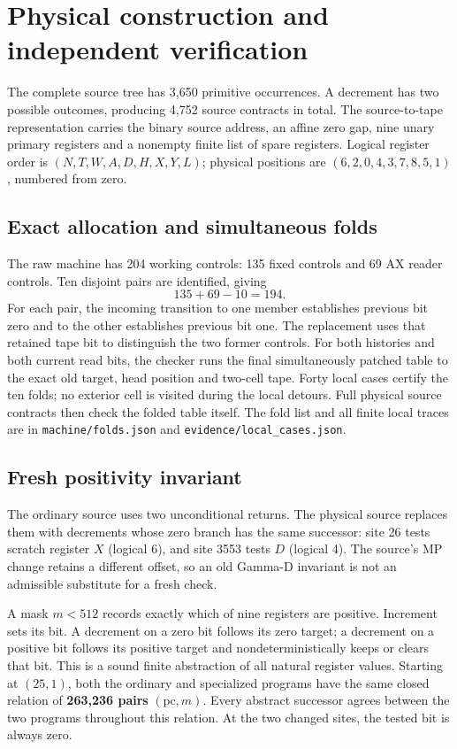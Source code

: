 \documentclass[11pt,letterpaper]{article}
\newcommand{\file}[1]{\texttt{\nolinkurl{#1}}}
\begin{document}
\section{Physical construction and independent verification}
\label{sec:physical}

The complete source tree has 3,650 primitive occurrences. A decrement has
two possible outcomes, producing 4,752 source contracts in total. The
source-to-tape representation carries the binary source address, an affine
zero gap, nine unary primary registers and a nonempty finite list of spare
registers. Logical register order is $(N,T,W,A,D,H,X,Y,L)$; physical positions
are $(6,2,0,4,3,7,8,5,1)$, numbered from zero.

\subsection{Exact allocation and simultaneous folds}

The raw machine has 204 working controls: 135 fixed controls and 69 AX
reader controls. Ten disjoint pairs are identified, giving
\[
                         135+69-10=194.
\]
For each pair, the incoming transition to one member establishes previous
bit zero and to the other establishes previous bit one. The replacement
uses that retained tape bit to distinguish the two former controls.
For both histories and both current read bits, the checker runs the final
simultaneously patched table to the exact old target, head position and
two-cell tape. Forty local cases certify the ten folds; no exterior cell
is visited during the local detours. Full physical source contracts then
check the folded table itself. The fold list and all finite local traces
are in \file{machine/folds.json} and \file{evidence/local_cases.json}.

\subsection{Fresh positivity invariant}

The ordinary source uses two unconditional returns. The physical source
replaces them with decrements whose zero branch has the same successor:
site 26 tests scratch register $X$ (logical 6), and site 3553 tests $D$
(logical 4). The source's MP change retains a different offset, so an old
Gamma-D invariant is not an admissible substitute for a fresh check.

A mask $m<512$ records exactly which of nine registers are positive.
Increment sets its bit. A decrement on a zero bit follows its zero target;
a decrement on a positive bit follows its positive target and nondeterministically
keeps or clears that bit. This is a sound finite abstraction of all natural
register values. Starting at $(25,1)$, both the ordinary and specialized
programs have the same closed relation of \textbf{263,236 pairs} $(\mathrm{pc},m)$.
Every abstract successor agrees between the two programs throughout this
relation. At the two changed sites, the tested bit is always zero.
\end{document}
